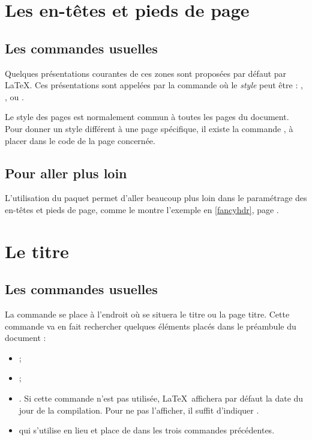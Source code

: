 \section{Les en-têtes et pieds de page} 

\subsection{Les  commandes usuelles}

Quelques présentations courantes de ces zones sont proposées par défaut par \LaTeX. Ces présentations sont appelées par la commande  où le \emph{style} peut être : , ,  ou .

Le style des pages est normalement commun à toutes les pages du document. Pour donner un style différent à une page spécifique, il existe la commande , à placer dans le code de la page concernée.

\subsection{Pour aller plus loin}

L'utilisation du paquet  permet d'aller beaucoup plus loin dans le paramétrage des en-têtes et pieds de page, comme le montre l'exemple en \ref{fancyhdr}, page \pageref{fancyhdr}.


\section{Le titre}  

\subsection{Les  commandes usuelles}

La commande  se place à l'endroit où se situera le titre ou la page titre. Cette commande va en fait rechercher quelques éléments placés dans le préambule du document : 
\begin{itemize}
\item {};
\item {};
\item {}. Si cette commande n'est pas utilisée, \LaTeX\ affichera par défaut la date du jour de la compilation. Pour ne pas l'afficher, il suffit d'indiquer .
\item {} qui s'utilise en lieu et place de  dans les trois commandes précédentes.
\end{itemize}

